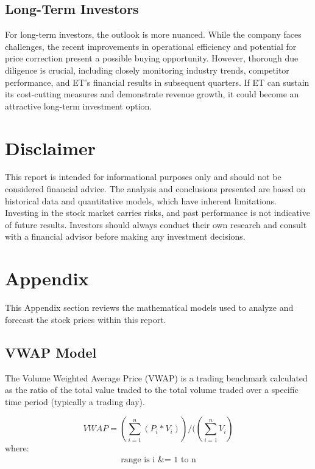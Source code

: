 \documentclass[9pt,a4paper,twoside]{tau}
\begin{document}
    \subsection{Long-Term Investors}

        For long-term investors, the outlook is more nuanced. While the company faces challenges, the recent improvements in operational efficiency and potential for price correction present a possible buying opportunity. However, thorough due diligence is crucial, including closely monitoring industry trends, competitor performance, and ET's financial results in subsequent quarters. If ET can sustain its cost-cutting measures and demonstrate revenue growth, it could become an attractive long-term investment option.

\section{Disclaimer}

    This report is intended for informational purposes only and should not be considered financial advice. The analysis and conclusions presented are based on historical data and quantitative models, which have inherent limitations. Investing in the stock market carries risks, and past performance is not indicative of future results. Investors should always conduct their own research and consult with a financial advisor before making any investment decisions.

\section{Appendix}

    This Appendix section reviews the mathematical models used to analyze and forecast the stock prices within this report.

    \subsection{VWAP Model}

        The Volume Weighted Average Price (VWAP) is a trading benchmark calculated as the ratio of the total value traded to the total volume traded over a specific time period (typically a trading day).
    
        \begin{equation}
        VWAP = (\sum_{i=1}^{n} (P_i * V_i)) / ((\sum_{i=1}^{n} V_i)
        \end{equation}
            where:
        \begin{align}
        \text{range is i &= 1 to n}\\
        \end{align}
\end{document}
